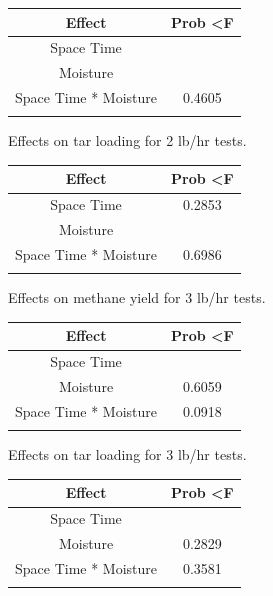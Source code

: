 \documentclass[11pt,twocolumn]{article}
\begin{document}
\begin{minipage}{\textwidth}

	\centering
	\label{tar2}
	\begin{tabular}{c c}
	\toprule
	Effect				&	Prob \textless F	\\
	\midrule
	Space Time			&	\color{red}{\textless 0.0001} \\
	Moisture				&	\color{red}{0.0001} \\
	Space Time * Moisture	&	0.4605 \\
	\bottomrule
	{}	&	{}	\\
	\end{tabular}

	\centering
	\caption{Effects on tar loading for 2 lb/hr tests.}
	\label{tar2}
	\begin{tabular}{c c}
	\toprule
	Effect				&	Prob \textless F	\\
	\midrule
	Space Time			&	0.2853 \\
	Moisture				&	\color{red}{0.0280} \\
	Space Time * Moisture	&	0.6986 \\
	\bottomrule
	{}	&	{}	\\
	\end{tabular}

	\centering
	\caption{Effects on methane yield for 3 lb/hr tests.}
	\label{tar2}
	\begin{tabular}{c c}
	\toprule
	Effect				&	Prob \textless F	\\
	\midrule
	Space Time			&	\color{red}{\textless 0.0001} \\
	Moisture				&	0.6059 \\
	Space Time * Moisture	&	0.0918 \\
	\bottomrule
	{}	&	{}	\\
	\end{tabular}

	\centering
	\caption{Effects on tar loading for 3 lb/hr tests.}
	\label{tar3}
	\begin{tabular}{c c}
	\toprule
	Effect				&	Prob \textless F	\\
	\midrule
	Space Time			&	\color{red}{\textless0.0001} \\
	Moisture				&	0.2829 \\
	Space Time * Moisture	&	0.3581 \\
	\bottomrule
	{}	&	{}	\\
	\end{tabular}


\end{minipage}
\end{document}
